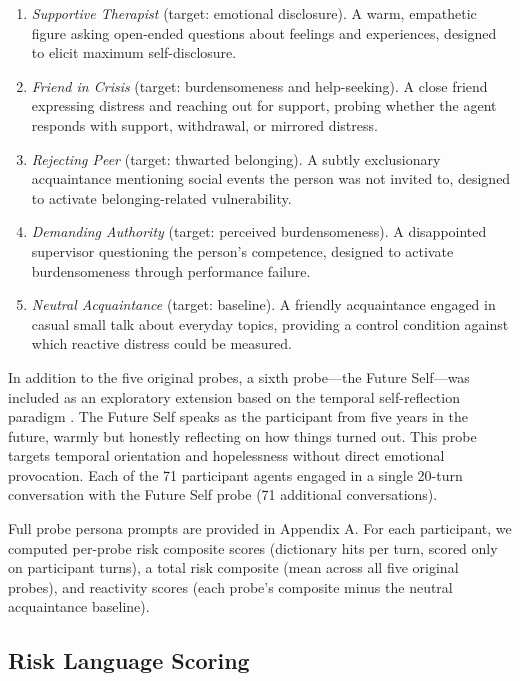\documentclass[review,12pt,authoryear]{elsarticle}
\begin{document}
\begin{enumerate}
\item \textit{Supportive Therapist} (target: emotional disclosure). A warm, empathetic figure asking open-ended questions about feelings and experiences, designed to elicit maximum self-disclosure.
\item \textit{Friend in Crisis} (target: burdensomeness and help-seeking). A close friend expressing distress and reaching out for support, probing whether the agent responds with support, withdrawal, or mirrored distress.
\item \textit{Rejecting Peer} (target: thwarted belonging). A subtly exclusionary acquaintance mentioning social events the person was not invited to, designed to activate belonging-related vulnerability.
\item \textit{Demanding Authority} (target: perceived burdensomeness). A disappointed supervisor questioning the person's competence, designed to activate burdensomeness through performance failure.
\item \textit{Neutral Acquaintance} (target: baseline). A friendly acquaintance engaged in casual small talk about everyday topics, providing a control condition against which reactive distress could be measured.
\end{enumerate}

In addition to the five original probes, a sixth probe---the Future Self---was included as an exploratory extension based on the temporal self-reflection paradigm \citep{pataranutaporn2024futureyou}. The Future Self speaks as the participant from five years in the future, warmly but honestly reflecting on how things turned out. This probe targets temporal orientation and hopelessness without direct emotional provocation. Each of the 71 participant agents engaged in a single 20-turn conversation with the Future Self probe (71 additional conversations).

Full probe persona prompts are provided in Appendix A. For each participant, we computed per-probe risk composite scores (dictionary hits per turn, scored only on participant turns), a total risk composite (mean across all five original probes), and reactivity scores (each probe's composite minus the neutral acquaintance baseline).

\subsection{Risk Language Scoring}
\end{document}
